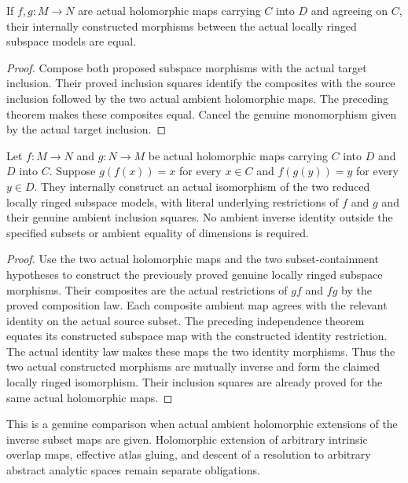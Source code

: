 \begin{theorem}
\label{hir:actual-analytic-subspace-map-eqOn}
\leanok
If $f,g:M\to N$ are actual holomorphic maps carrying $C$ into $D$ and
agreeing on $C$, their internally constructed morphisms between the
actual locally ringed subspace models are equal.
\end{theorem}
\begin{proof}
Compose both proposed subspace morphisms with the actual target
inclusion. Their proved inclusion squares identify the composites with
the source inclusion followed by the two actual ambient holomorphic
maps. The preceding theorem makes these composites equal. Cancel the
genuine monomorphism given by the actual target inclusion.
\end{proof}

\begin{theorem}
\label{hir:actual-analytic-subspace-mutual-restriction-iso}
\leanok
Let $f:M\to N$ and $g:N\to M$ be actual holomorphic maps carrying $C$
into $D$ and $D$ into $C$. Suppose $g(f(x))=x$ for every $x\in C$ and
$f(g(y))=y$ for every $y\in D$. They internally construct an actual
isomorphism of the two reduced locally ringed subspace models, with
literal underlying restrictions of $f$ and $g$ and their genuine
ambient inclusion squares. No ambient inverse identity outside the
specified subsets or ambient equality of dimensions is required.
\end{theorem}
\begin{proof}
Use the two actual holomorphic maps and the two subset-containment
hypotheses to construct the previously proved genuine locally ringed
subspace morphisms. Their composites are the actual restrictions of
$gf$ and $fg$ by the proved composition law. Each composite ambient
map agrees with the relevant identity on the actual source subset.
The preceding independence theorem equates its constructed subspace
map with the constructed identity restriction. The actual identity
law makes these maps the two identity morphisms. Thus the two actual
constructed morphisms are mutually inverse and form the claimed
locally ringed isomorphism. Their inclusion squares are already proved
for the same actual holomorphic maps.
\end{proof}

This is a genuine comparison when actual ambient holomorphic extensions
of the inverse subset maps are given. Holomorphic extension of arbitrary
intrinsic overlap maps, effective atlas gluing, and descent of a resolution
to arbitrary abstract analytic spaces remain separate obligations.
